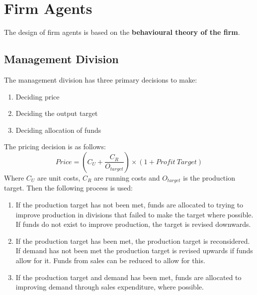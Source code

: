 \documentclass[11pt]{article}
\begin{document}
	
\section{Firm Agents}

The design of firm agents is based on the \textbf{behavioural theory of the firm}.

\subsection{Management Division}
The management division has three primary decisions to make:
\begin{enumerate}
	\item Deciding price
	\item Deciding the output target
	\item Deciding allocation of funds
\end{enumerate}
The pricing decision is as follows:
\[
	Price = (C_U + \frac{C_R}{O_{target}}) \times (1 + Profit\ Target)
\]
Where $ C_U $ are unit costs, $ C_R $ are running costs and $ O_{target} $ is the production target. Then the following process is used:
\begin{enumerate}
	\item If the production target has not been met, funds are allocated to trying to improve production in divisions that failed to make the target where possible. If funds do not exist to improve production, the target is revised downwards.
	\item If the production target has been met, the production target is reconsidered. If demand has not been met the production target is revised upwards if funds allow for it. Funds from sales can be reduced to allow for this.
	\item If the production target and demand has been met, funds are allocated to improving demand through sales expenditure, where possible.
\end{enumerate}
\end{document}
